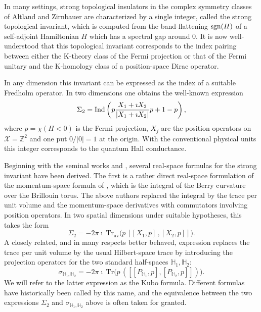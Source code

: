 \documentclass[12pt]{amsart}
\newcommand{\ZM}{{\mathbb Z}}
\newcommand{\HM}{{\mathbb H}}
\newcommand{\Xx}{{\mathcal X}}
\newcommand{\Ind}{{\rm Ind}}
\newcommand{\sgn}{{\rm sgn}}
\begin{document}
In many settings, strong topological insulators in the complex symmetry classes of Altland and Zirnbauer \cite{Altland1997, Zirnbauer1996} are characterized by a single integer, called the strong topological invariant, which is computed from the band-flattening $\sgn(H)$ of a self-adjoint Hamiltonian $H$ which has a spectral gap around $0$. It is now well-understood that this topological invariant corresponds to the index pairing between either the K-theory class of the Fermi projection or that of the Fermi unitary and the K-homology class of a position-space Dirac operator.

In any dimension this invariant can be expressed as the index of a suitable Fredholm operator. In two dimensions one obtains the well-known expression \cite{BellissardVanElstSchulzBaldes1994}
\begin{equation}
\label{eq:index}
\Sigma_2=\Ind\left(p \frac{X_1+ \imath X_2}{|X_1+ \imath X_2|}p + 1-p\right),
\end{equation}
where $p=\chi(H < 0)$ is the Fermi projection, $X_j$ are the position operators on $\Xx = \ZM^2$ and one put $0/|0|=1$ at the origin. With the conventional physical units this integer corresponds to the quantum Hall conductance.

Beginning with the seminal works \cite{BellissardVanElstSchulzBaldes1994} and \cite{AvronSeilerSimon1994}, several real-space formulas for the strong invariant have been derived. The first is a rather direct real-space formulation of the momentum-space formula of \cite{TKNN}, which is the integral of the Berry curvature over the Brillouin torus. The above authors replaced the integral by the trace per unit volume and the momentum-space derivatives with commutators involving position operators. In two spatial dimensions under suitable hypotheses, this takes the form
\begin{equation}
\label{eq:kubo_tpuv_intro}
\Sigma_2 = -2\pi \imath\, \mathrm{Tr}_{\mathrm{av}}\big( p\,[[X_1,p]\,,[X_2,p]]\big).
\end{equation} 
A closely related, and in many respects better behaved, expression replaces the trace per unit volume by the usual Hilbert-space trace by introducing the projection operators for the two standard half-spaces $\HM_1, \HM_2$:
\begin{equation}
\label{eq:double_comm_intro}
\sigma_{\HM_1,\HM_2} = -2\pi \imath\, \mathrm{Tr}\big(p\,([[P_{\HM_1},p],[P_{\HM_2},p]])\big).
\end{equation} 
We will refer to the latter expression as the Kubo formula. Different formulas have historically been called by this name, and the equivalence between the two expressions $\Sigma_2$ and $\sigma_{\HM_1,\HM_2}$ above is often taken for granted.
\end{document}
